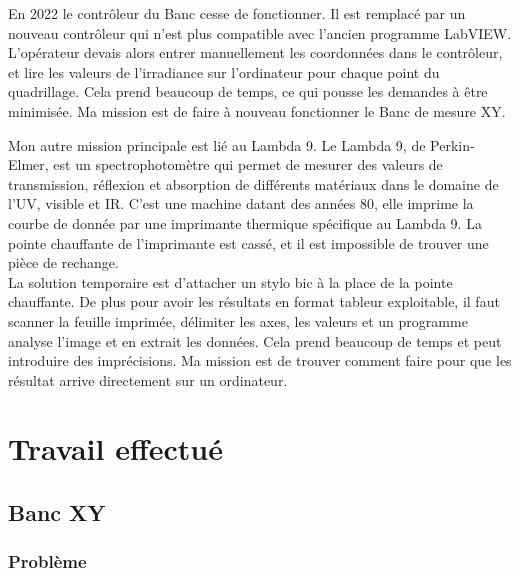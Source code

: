 \documentclass[12pt]{article}
\begin{document}
En 2022 le contrôleur du Banc cesse de fonctionner.
Il est remplacé par un nouveau contrôleur qui n'est plus compatible avec l'ancien programme LabVIEW.\\
L'opérateur devais alors entrer manuellement les coordonnées dans le contrôleur, et lire les valeurs de l'irradiance sur l'ordinateur pour chaque point du quadrillage.
Cela prend beaucoup de temps, ce qui pousse les demandes à être minimisée.
Ma mission est de faire à nouveau fonctionner le Banc de mesure XY.


Mon autre mission principale est lié au Lambda 9.
Le Lambda 9, de Perkin-Elmer, est un spectrophotomètre qui permet de mesurer des valeurs de transmission, réflexion et absorption de différents matériaux dans le domaine de l'UV, visible et IR.
C'est une machine datant des années 80, elle imprime la courbe de donnée par une imprimante thermique spécifique au Lambda 9.
La pointe chauffante de l'imprimante est cassé, et il est impossible de trouver une pièce de rechange.\\
La solution temporaire est d'attacher un stylo bic à la place de la pointe chauffante.
De plus pour avoir les résultats en format tableur exploitable, il faut scanner la feuille imprimée, délimiter les axes, les valeurs et un programme analyse l'image et en extrait les données.
Cela prend beaucoup de temps et peut introduire des imprécisions.
Ma mission est de trouver comment faire pour que les résultat arrive directement sur un ordinateur.
\newpage

\section{Travail effectué}

\subsection{Banc XY}

\subsubsection{Problème}
\end{document}
